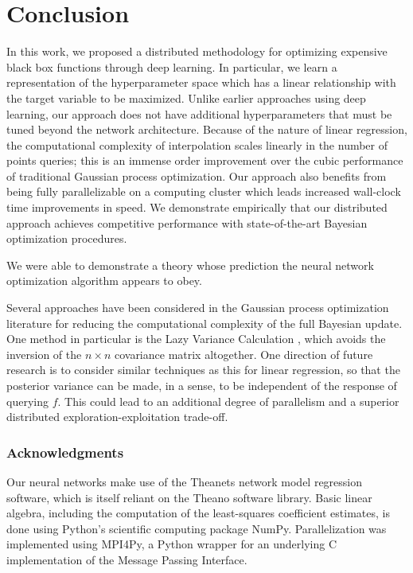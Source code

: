 \documentclass[]{article}
\newcommand{\1}{\mathbf{1}}
\newcommand{\0}{\mathbf{0}}
\begin{document}
\section{Conclusion}

In this work, we proposed a distributed methodology for optimizing expensive black box functions through deep learning. In particular, we learn a representation of the hyperparameter space which has a linear relationship with the target variable to be maximized. Unlike earlier approaches using deep learning, our approach does not have additional hyperparameters that must be tuned beyond the network architecture. Because of the nature of linear regression, the computational complexity of interpolation scales linearly in the number of points queries; this is an immense order improvement over the cubic performance of traditional Gaussian process optimization. Our approach also benefits from being fully parallelizable on a computing cluster which leads increased wall-clock time improvements in speed. We demonstrate empirically that our distributed approach achieves competitive performance with state-of-the-art Bayesian optimization procedures.

We were able to demonstrate a theory whose prediction the neural network optimization algorithm appears to obey. 

Several approaches have been considered in the Gaussian process optimization literature for reducing the computational complexity of the full Bayesian update. One method in particular is the Lazy Variance Calculation \cite{desautels}, which avoids the inversion of the $n\times n$ covariance matrix altogether. One direction of future research is to consider similar techniques as this for linear regression, so that the posterior variance can be made, in a sense, to be independent of the response of querying $f$. This could lead to an additional degree of parallelism and a superior distributed exploration-exploitation trade-off. 


\subsubsection*{Acknowledgments}

Our neural networks make use of the Theanets network model regression software, which is itself reliant on the Theano software library. Basic linear algebra, including the computation of the least-squares coefficient estimates, is done using Python's scientific computing package NumPy. Parallelization was implemented using MPI4Py, a Python wrapper for an underlying C implementation of the Message Passing Interface. 
\end{document}

